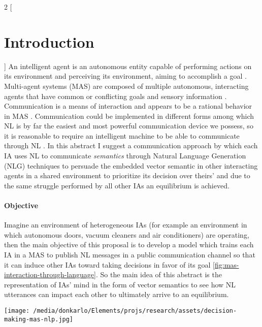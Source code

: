 \documentclass{article}
\begin{document}
	\begin{multicols}{2}
	[
	\section{Introduction}
	]
		An intelligent agent is an autonomous entity capable of performing actions on its environment and perceiving its environment, aiming to accomplish a goal \citep{stuart-2009-artificial-intelligence-a-modern-approach}. Multi-agent systems (MAS) are composed of multiple autonomous, interacting agents that have common or conflicting goals and sensory information \citep{shoham-2009-multiagent-systems-algorithmic-game-theoretic-and-logical-foundations}. Communication is a means of interaction and appears to be a rational behavior in MAS \citep{yan-2013-a-survey-and-analysis-of-multi-robot-coordination}. Communication could be implemented in different forms among which NL is by far the easiest and most powerful communication device we possess, so it is reasonable to require an intelligent machine to be able to communicate through NL \citep{mikolov-2016-a-roadmap-towards-machine-intelligence}. 
		In this abstract I suggest a communication approach by which each IA uses NL to communicate \textit{semantics} through Natural Language Generation (NLG) techniques to persuade the embedded vector semantic in other interacting agents in a shared environment to prioritize its decision over theirs' and due to the same struggle performed by all other IAs an equilibrium is achieved. 
		
		\paragraph{Objective} Imagine an environment of heterogeneous IAs (for example an environment in which autonomous doors, vacuum cleaners and air conditioners) are operating, then the main objective of this proposal is to develop a model which trains each IA in a MAS to publish NL messages in a public communication channel so that it can induce other IAs toward taking decisions in favor of its goal \ref{fig:mas-interaction-through-language}. So the main idea of this abstract is the representation of IAs' mind in the form of vector semantics to see how NL utterances can impact each other to ultimately arrive to an equilibrium. 
		 
		\begin{figure*}
			\centering
			\texttt{[image: /media/donkarlo/Elements/projs/research/assets/decision-making-mas-nlp.jpg]}
			\caption{A drone persuades an AV to clear its landing site}
			\label{fig:mas-interaction-through-language}
		\end{figure*}
	

\end{multicols}
\end{document}
